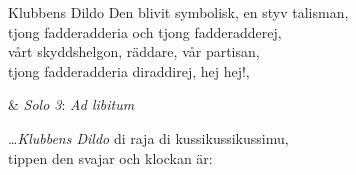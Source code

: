 \begin{song}{Klubbens Dildo}
	\showversenumber
	Den blivit symbolisk, en styv talisman,\\
	tjong fadderadderia och tjong fadderadderej,\\
	vårt skyddshelgon, räddare, vår partisan,\\
	tjong fadderadderia diraddirej, hej hej!,
	
	\vspace{0.3cm}
	\begin{alternatinglyrics}[2]
		&	\emph{Solo 3}: \emph{Ad libitum}
	\end{alternatinglyrics}

	\dots \emph{Klubbens Dildo} di raja di kussikussikussimu,\\
	tippen den svajar och klockan är:

	
\end{song}
